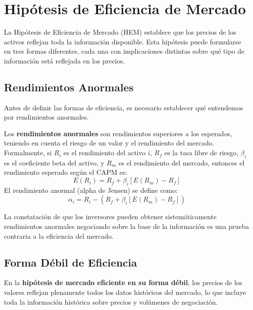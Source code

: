 \section{Hipótesis de Eficiencia de Mercado}

La Hipótesis de Eficiencia de Mercado (HEM) establece que los precios de los activos reflejan toda la información disponible. Esta hipótesis puede formularse en tres formas diferentes, cada una con implicaciones distintas sobre qué tipo de información está reflejada en los precios.

\subsection{Rendimientos Anormales}

Antes de definir las formas de eficiencia, es necesario establecer qué entendemos por rendimientos anormales.

\begin{definicion}
Los \textbf{rendimientos anormales} son rendimientos superiores a los esperados, teniendo en cuenta el riesgo de un valor y el rendimiento del mercado. Formalmente, si $R_i$ es el rendimiento del activo $i$, $R_f$ es la tasa libre de riesgo, $\beta_i$ es el coeficiente beta del activo, y $R_m$ es el rendimiento del mercado, entonces el rendimiento esperado según el CAPM es:
\begin{equation}
E(R_i) = R_f + \beta_i[E(R_m) - R_f]
\end{equation}
El rendimiento anormal (alpha de Jensen) se define como:
\begin{equation}
\alpha_i = R_i - (R_f + \beta_i[E(R_m) - R_f])
\end{equation}
\end{definicion}

La constatación de que los inversores pueden obtener sistemáticamente rendimientos anormales negociando sobre la base de la información es una prueba contraria a la eficiencia del mercado.

\subsection{Forma Débil de Eficiencia}

\begin{definicion}
En la \textbf{hipótesis de mercado eficiente en su forma débil}, los precios de los valores reflejan plenamente todos los datos históricos del mercado, lo que incluye toda la información histórica sobre precios y volúmenes de negociación.
\end{definicion}

